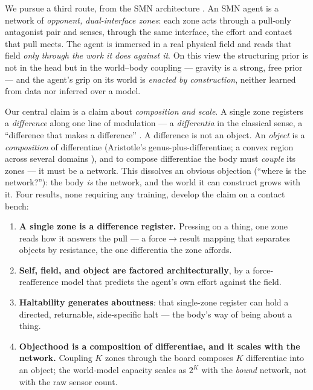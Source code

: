 \documentclass[11pt]{article}
\begin{document}
We pursue a third route, from the SMN architecture \citep{NagarjunaKarnam2026SMN}.
An SMN agent is a network of \emph{opponent, dual-interface zones}: each zone acts
through a pull-only antagonist pair and senses, through the same interface, the
effort and contact that pull meets. The agent is immersed in a real physical
field and reads that field \emph{only through the work it does against it}. On
this view the structuring prior is not in the head but in the world--body
coupling --- gravity is a strong, free prior --- and the agent's grip on its
world is \emph{enacted by construction}, neither learned from data nor inferred
over a model.

Our central claim is a claim about \emph{composition and scale}. A single zone
registers a \emph{difference} along one line of modulation --- a \emph{differentia}
in the classical sense, a ``difference that makes a difference''
\citep{Bateson1972}. A difference is not an object. An \emph{object} is a
\emph{composition} of differentiae (Aristotle's genus-plus-differentiae; a convex
region across several domains \citep{Gardenfors2014}), and to compose differentiae
the body must \emph{couple} its zones --- it must be a network. This dissolves an
obvious objection (``where is the network?''): the body \emph{is} the network, and
the world it can construct grows with it. Four results, none requiring any
training, develop the claim on a contact bench:

\begin{enumerate}
\item \textbf{A single zone is a difference register.} Pressing on a thing, one
  zone reads how it answers the pull --- a force$\to$result mapping that separates
  objects by resistance, the one differentia the zone affords.
\item \textbf{Self, field, and object are factored architecturally}, by a
  force-reafference model that predicts the agent's own effort against the field.
\item \textbf{Haltability generates aboutness}: that single-zone register can hold
  a directed, returnable, side-specific halt --- the body's way of being about a
  thing.
\item \textbf{Objecthood is a composition of differentiae, and it scales with the
  network.} Coupling $K$ zones through the board composes $K$ differentiae into an
  object; the world-model capacity scales as $2^{K}$ with the \emph{bound}
  network, not with the raw sensor count.
\end{enumerate}
\end{document}
